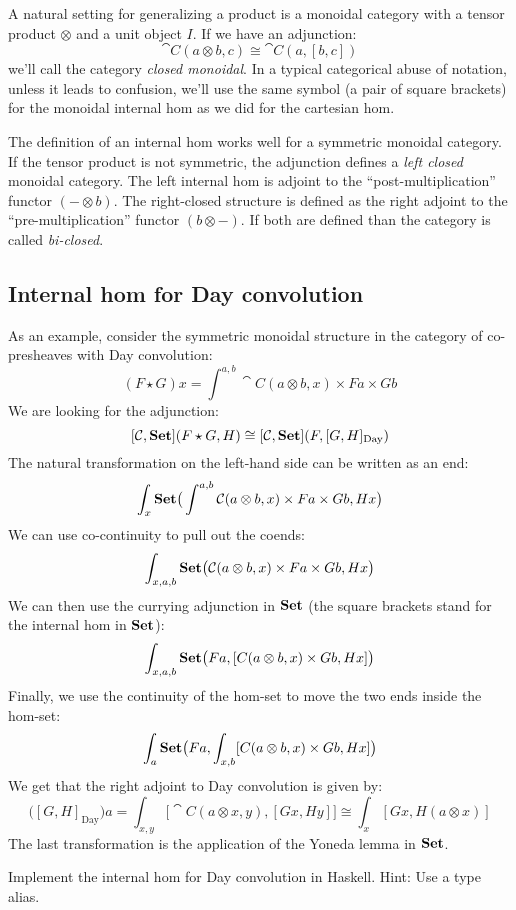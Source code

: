 \documentclass[DaoFP]{subfiles}
\begin{document}
A natural setting for generalizing a product is a monoidal category with a tensor product $\otimes$ and a unit object $I$. If we have an adjunction:
\[ \cat C (a \otimes b, c) \cong \cat C (a, [b, c]) \]
we'll call the category \emph{closed monoidal}. In a typical categorical abuse of notation, unless it leads to confusion, we'll use the same symbol (a pair of square brackets)  for the monoidal internal hom as we did for the cartesian hom.

The definition of an internal hom works well for a symmetric monoidal category. If the tensor product is not symmetric, the adjunction defines a \emph{left closed} monoidal category. The left internal hom is adjoint to the ``post-multiplication'' functor $(- \otimes b)$. The right-closed structure is defined as the right adjoint to the ``pre-multiplication'' functor $(b \otimes -)$. If both are defined than the category is called \emph{bi-closed}.


\subsection{Internal hom for Day convolution}

As an example, consider the symmetric monoidal structure in the category of co-presheaves with Day convolution:
\[ (F \star G) x = \int^{a, b} \cat C (a \otimes b, x) \times F a \times G b \]
We are looking for the adjunction:
\[ [\mathcal{C}, \mathbf{Set}] (F \star G, H) \cong  [\mathcal{C}, \mathbf{Set}] (F, [G, H]_{\text{Day}}) \]
The natural transformation on the left-hand side can be written as an end:
\[ \int_x \mathbf{Set} \big( \int^{a, b} \mathcal{C} (a \otimes b, x) \times F a \times G b, H x \big) \]
We can use co-continuity to pull out the coends:
\[ \int_{x, a, b} \mathbf{Set} \big( \mathcal{C} (a \otimes b, x) \times F a \times G b, H x \big) \]
We can then use the currying adjunction in $\mathbf{Set}$ (the square brackets stand for the internal hom in $\mathbf{Set}$):
\[ \int_{x, a, b} \mathbf{Set} \big( F a, [C (a \otimes b, x)  \times G b, H x] \big) \]
Finally, we use the continuity of the hom-set to move the two ends inside the hom-set:
\[ \int_{a} \mathbf{Set} \big( F a, \int_{x, b} [C (a \otimes b, x)  \times G b, H x] \big) \]
We get that the right adjoint to Day convolution is given by:
\[ \big([G, H]_{\text{Day}}\big) a = \int_{x, y} \big[\cat C(a \otimes x, y), [G x, H y]\big] \cong \int_x [G x, H (a \otimes x)]\]
The last transformation is the application of the Yoneda lemma in $\mathbf{Set}$.
\begin{exercise}
Implement the internal hom for Day convolution in Haskell. Hint: Use a type alias.
\end{exercise}
\end{document}
